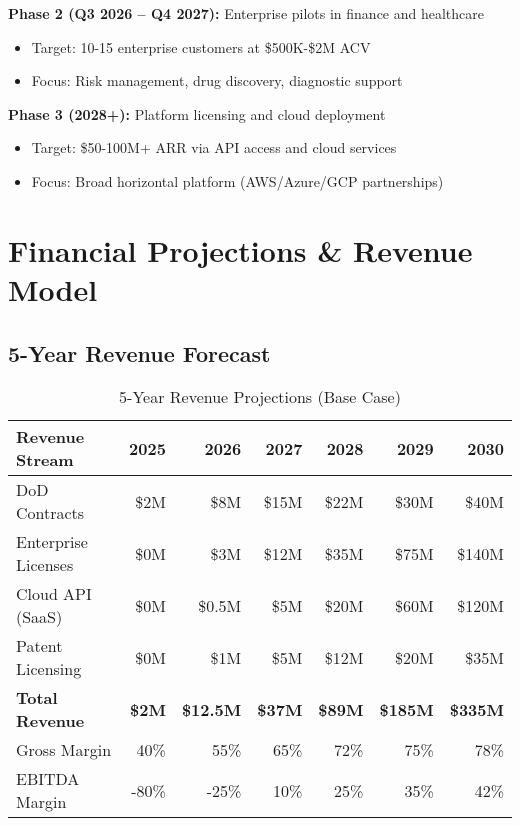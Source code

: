 \documentclass[11pt,letterpaper]{article}
\begin{document}
\textbf{Phase 2 (Q3 2026 -- Q4 2027):} Enterprise pilots in finance and healthcare
\begin{itemize}
    \item Target: 10-15 enterprise customers at \$500K-\$2M ACV
    \item Focus: Risk management, drug discovery, diagnostic support
\end{itemize}

\textbf{Phase 3 (2028+):} Platform licensing and cloud deployment
\begin{itemize}
    \item Target: \$50-100M+ ARR via API access and cloud services
    \item Focus: Broad horizontal platform (AWS/Azure/GCP partnerships)
\end{itemize}

\newpage

\section{Financial Projections \& Revenue Model}

\subsection{5-Year Revenue Forecast}

\begin{table}[H]
\centering
\begin{tabularx}{\textwidth}{Xrrrrrr}
\toprule
\textbf{Revenue Stream} & \textbf{2025} & \textbf{2026} & \textbf{2027} & \textbf{2028} & \textbf{2029} & \textbf{2030} \\
\midrule
DoD Contracts & \$2M & \$8M & \$15M & \$22M & \$30M & \$40M \\
Enterprise Licenses & \$0M & \$3M & \$12M & \$35M & \$75M & \$140M \\
Cloud API (SaaS) & \$0M & \$0.5M & \$5M & \$20M & \$60M & \$120M \\
Patent Licensing & \$0M & \$1M & \$5M & \$12M & \$20M & \$35M \\
\midrule
\textbf{Total Revenue} & \textbf{\$2M} & \textbf{\$12.5M} & \textbf{\$37M} & \textbf{\$89M} & \textbf{\$185M} & \textbf{\$335M} \\
\midrule
Gross Margin & 40\% & 55\% & 65\% & 72\% & 75\% & 78\% \\
EBITDA Margin & -80\% & -25\% & 10\% & 25\% & 35\% & 42\% \\
\bottomrule
\end{tabularx}
\caption{5-Year Revenue Projections (Base Case)}
\end{table}
\end{document}
